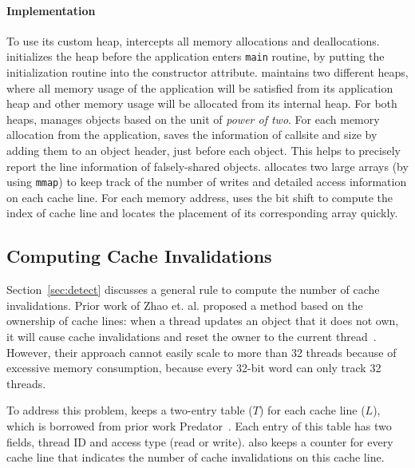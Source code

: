 \paragraph{Implementation} 
To use its custom heap, \cheetah{} intercepts all memory allocations and deallocations. \cheetah{} initializes the heap before the application enters \texttt{main} routine, by putting the initialization routine into the constructor attribute. \cheetah{} maintains two different heaps, where all memory usage of the application will be satisfied from its application heap and other memory usage will be allocated from its internal heap. For both heaps, \cheetah{} manages objects based on the unit of {\it power of two}. For each memory allocation from the application, \cheetah{} saves the information of callsite and size by adding them to an object header, just before each object. This helps \cheetah{} to precisely report the line information of falsely-shared objects.  
\Cheetah{} allocates two large arrays (by using \texttt{mmap}) to keep track of the number of writes and detailed access information on each cache line. For each memory address, \cheetah{} uses the bit shift to compute the index of cache line and locates the placement of its corresponding array quickly. 


\subsection{Computing Cache Invalidations}
\label{sec:computeinvalidations}

Section~\ref{sec:detect} discusses a general rule to compute the number of cache invalidations. Prior work of Zhao et. al. proposed a method based on the ownership of cache lines: when a thread updates an object that it does not own, it will cause cache invalidations and reset the owner to the current thread~\cite{qinzhao}. However, their approach cannot easily scale to more than 32 threads because of excessive memory consumption, because every 32-bit word can only track 32 threads.  

To address this problem, \Cheetah{} keeps a two-entry table ($T$) for each cache line ($L$),  which is borrowed from prior work Predator~\cite{Predator}. Each entry of this table has two fields,   thread ID and access type (read or write). \Cheetah{} also keeps a counter for every cache line that indicates the number of cache invalidations on this cache line.  

